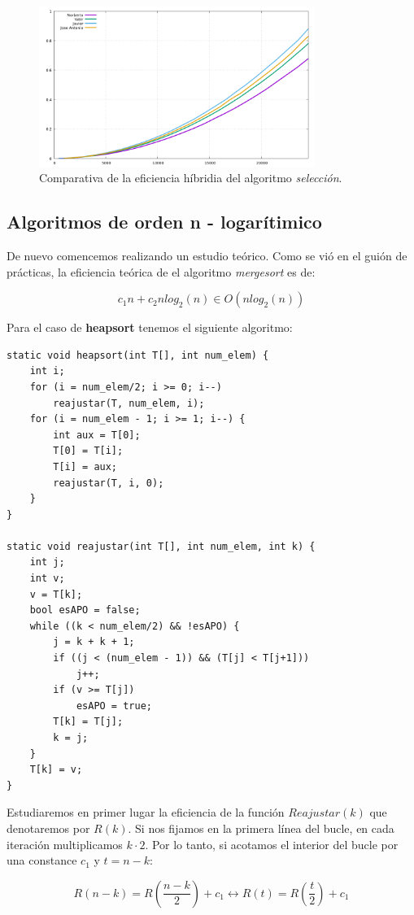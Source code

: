 \documentclass[11pt,a4paper]{article}
\begin{document}
\begin{figure}[H]
	\centering
	\includegraphics[width=0.8\textwidth]{../plots/seleccion}
	\caption{Comparativa de la eficiencia híbridia del algoritmo \emph{selección}.}
\end{figure}

\subsection{Algoritmos de orden n - logarítimico}

De nuevo comencemos realizando un estudio teórico. Como se vió en el
guión de prácticas, la eficiencia teórica de el algoritmo
\emph{mergesort} es de:

$$c_1n + c_2nlog_2(n) \in O(nlog_2(n))$$

Para el caso de \textbf{heapsort} tenemos el siguiente algoritmo:

\begin{lstlisting}
static void heapsort(int T[], int num_elem) {
	int i;
	for (i = num_elem/2; i >= 0; i--)
		reajustar(T, num_elem, i);
	for (i = num_elem - 1; i >= 1; i--) {
		int aux = T[0];
		T[0] = T[i];
		T[i] = aux;
		reajustar(T, i, 0);
	}
}

static void reajustar(int T[], int num_elem, int k) {
	int j;
	int v;
	v = T[k];
	bool esAPO = false;
	while ((k < num_elem/2) && !esAPO) {
		j = k + k + 1;
		if ((j < (num_elem - 1)) && (T[j] < T[j+1]))
			j++;
		if (v >= T[j])
			esAPO = true;
		T[k] = T[j];
		k = j;
	}
	T[k] = v;
}
\end{lstlisting}

Estudiaremos en primer lugar la eficiencia de la función
$Reajustar(k)$ que denotaremos por $R(k)$. Si nos fijamos en la
primera línea del bucle, en cada iteración multiplicamos $k \cdot
2$. Por lo tanto, si acotamos el interior del bucle por una constance
$c_1$ y $ t = n-k$:

$$R(n-k) = R(\frac{n-k}{2}) + c_1 \leftrightarrow R(t) = R(\frac{t}{2}) + c_1$$
\end{document}
